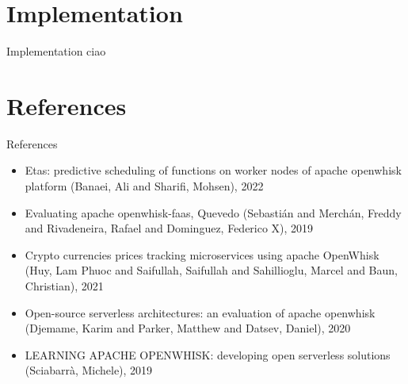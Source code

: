 \documentclass[aspectratio=169]{beamer}
\begin{document}
\section{Implementation}
\begin{frame}{Implementation}
    ciao
\end{frame}

\section*{References}
\begin{frame}{References}
    \begin{itemize}
        \item Etas: predictive scheduling of functions on worker nodes of apache openwhisk platform (Banaei, Ali and Sharifi, Mohsen), 2022
        \item Evaluating apache openwhisk-faas, Quevedo (Sebasti{\'a}n and Merch{\'a}n, Freddy and Rivadeneira, Rafael and Dominguez, Federico X), 2019
        \item Crypto currencies prices tracking microservices using apache OpenWhisk (Huy, Lam Phuoc and Saifullah, Saifullah and Sahillioglu, Marcel and Baun, Christian), 2021 
        \item Open-source serverless architectures: an evaluation of apache openwhisk (Djemame, Karim and Parker, Matthew and Datsev, Daniel), 2020
        \item LEARNING APACHE OPENWHISK: developing open serverless solutions (Sciabarr{\`a}, Michele), 2019
    \end{itemize}
\end{frame}
\end{document}
